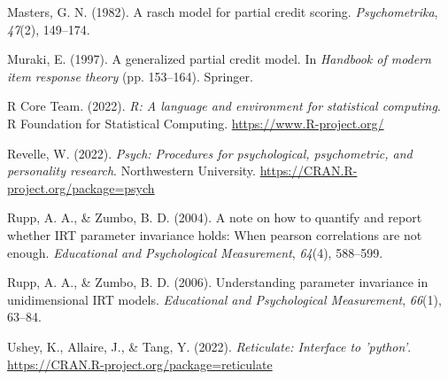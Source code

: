 \documentclass[
  man]{apa6}
\newlength{\cslhangindent}
\newlength{\cslentryspacingunit} %
\newenvironment{CSLReferences}[2] %
 {%
  \setlength{\parindent}{0pt}
  \ifodd #1
  \let\oldpar\par
  \def\par{\hangindent=\cslhangindent\oldpar}
  \fi
  \setlength{\parskip}{#2\cslentryspacingunit}
 }%
 {}
\begin{document}
\begin{CSLReferences}{1}{0}
\leavevmode{}%
Masters, G. N. (1982). A rasch model for partial credit scoring. \emph{Psychometrika}, \emph{47}(2), 149--174.

\leavevmode{}%
Muraki, E. (1997). A generalized partial credit model. In \emph{Handbook of modern item response theory} (pp. 153--164). Springer.

\leavevmode{}%
R Core Team. (2022). \emph{R: A language and environment for statistical computing}. R Foundation for Statistical Computing. \url{https://www.R-project.org/}

\leavevmode{}%
Revelle, W. (2022). \emph{Psych: Procedures for psychological, psychometric, and personality research}. Northwestern University. \url{https://CRAN.R-project.org/package=psych}

\leavevmode{}%
Rupp, A. A., \& Zumbo, B. D. (2004). A note on how to quantify and report whether IRT parameter invariance holds: When pearson correlations are not enough. \emph{Educational and Psychological Measurement}, \emph{64}(4), 588--599.

\leavevmode{}%
Rupp, A. A., \& Zumbo, B. D. (2006). Understanding parameter invariance in unidimensional IRT models. \emph{Educational and Psychological Measurement}, \emph{66}(1), 63--84.

\leavevmode{}%
Ushey, K., Allaire, J., \& Tang, Y. (2022). \emph{Reticulate: Interface to 'python'}. \url{https://CRAN.R-project.org/package=reticulate}

\end{CSLReferences}

\endgroup
\end{document}
